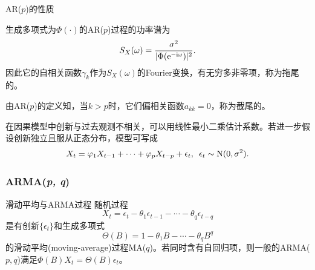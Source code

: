 \begin{theorem}{AR($p$)的性质}{}
	\begin{compactitem}
		\item 生成多项式为$\Phi(\cdot)$的AR($p$)过程的功率谱为
		\begin{equation}\label{eq:ps-ar-spectrum}
			S_X(\omega) = \frac{\sigma^2}{\lvert\Phi(\mathop{}\!\mathrm{e}^{-\mathrm{i}\omega})\rvert^2}.
		\end{equation}
		因此它的自相关函数$\gamma_k$作为$ S_X(\omega) $的Fourier变换，有无穷多非零项，称为拖尾的。
		\item 由AR($p$)的定义知，当$ k > p $时，它们偏相关函数$ a_{kk} = 0$，称为截尾的。
	\end{compactitem}
\end{theorem}
在因果模型中创新与过去观测不相关，可以用线性最小二乘估计系数。若进一步假设创新独立且服从正态分布，模型可写成
\[
	X_t = \varphi_1X_{t-1} + \cdots + \varphi_pX_{t-p} + \epsilon_t,\enspace\epsilon_t \sim \operatorname{N}(0,\sigma^2).
\]
\subsubsection{ARMA(\textit{p, q})}
\begin{definition}{滑动平均与ARMA过程}{}
	随机过程
	\begin{equation}\label{eq:ps-moving-average}
		X_t = \epsilon_t - \theta_1\epsilon_{t-1} - \cdots - \theta_q\epsilon_{t-q}
	\end{equation}
	是有创新$\{\epsilon_t\}$和生成多项式
	\begin{equation}
		\Theta(B) = 1 - \theta_1B - \cdots - \theta_qB^q
	\end{equation}
	的滑动平均(moving-average)过程MA($q$)。若同时含有自回归项，则一般的ARMA($p,q$)满足$\Phi(B)X_t = \Theta(B)\epsilon_t$。
\end{definition}
